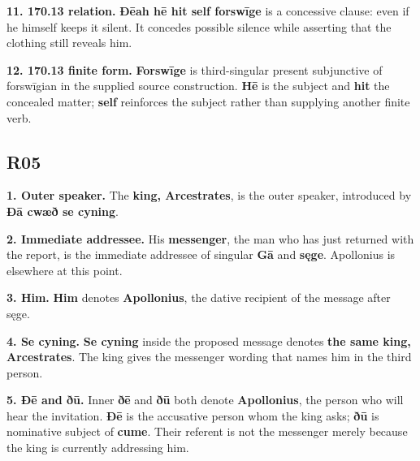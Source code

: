\textbf{11. 170.13 relation.} \textbf{Ðēah hē hit self forswīge} is a concessive clause: even if he himself keeps it silent. It concedes possible silence while asserting that the clothing still reveals him.

\textbf{12. 170.13 finite form.} \textbf{Forswīge} is third-singular present subjunctive of forswīgian in the supplied source construction. \textbf{Hē} is the subject and \textbf{hit} the concealed matter; \textbf{self} reinforces the subject rather than supplying another finite verb.

\subsection*{R05}

\textbf{1. Outer speaker.} The \textbf{king, Arcestrates}, is the outer speaker, introduced by \textbf{Ðā cwæð se cyning}.

\textbf{2. Immediate addressee.} His \textbf{messenger}, the man who has just returned with the report, is the immediate addressee of singular \textbf{Gā} and \textbf{sęge}. Apollonius is elsewhere at this point.

\textbf{3. Him.} \textbf{Him} denotes \textbf{Apollonius}, the dative recipient of the message after sęge.

\textbf{4. Se cyning.} \textbf{Se cyning} inside the proposed message denotes \textbf{the same king, Arcestrates}. The king gives the messenger wording that names him in the third person.

\textbf{5. Ðē and ðū.} Inner \textbf{ðē} and \textbf{ðū} both denote \textbf{Apollonius}, the person who will hear the invitation. \textbf{Ðē} is the accusative person whom the king asks; \textbf{ðū} is nominative subject of \textbf{cume}. Their referent is not the messenger merely because the king is currently addressing him.

